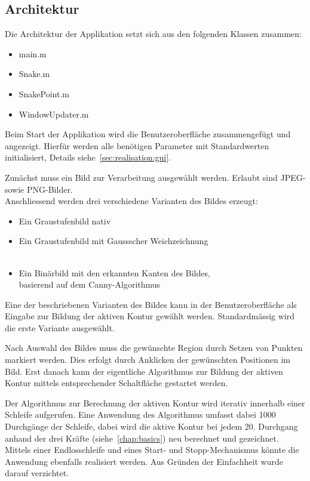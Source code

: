\subsection{Architektur}
\label{subsec:realization:arch}
Die Architektur der Applikation setzt sich aus den folgenden Klassen zusammen:

\begin{itemize}
    \item main.m
    \item Snake.m
    \item SnakePoint.m
    \item WindowUpdater.m
\end{itemize}

Beim Start der Applikation wird die Benutzeroberfläche zusammengefügt und angezeigt. Hierfür werden alle benötigen Parameter mit Standardwerten initialisiert, Details siehe~\ref{sec:realisation:gui}.

Zunächst muss ein Bild zur Verarbeitung ausgewählt werden. Erlaubt sind JPEG- sowie PNG-Bilder.\\
Anschliessend werden drei verschiedene Varianten des Bildes erzeugt:
\begin{itemize}
    \item Ein Graustufenbild nativ
    \item Ein Graustufenbild mit Gaussscher Weichzeichnung\\
        ~\cite[Details siehe Abschnitt 6.2.1.1, Seite 76]{hudritsch:script:cp}
    \item Ein Binärbild mit den erkannten Kanten des Bildes,\\
        basierend auf dem Canny-Algorithmus\\
        \cite[Details siehe Abschnitt 8.3.3, Seite 140]{hudritsch:script:cp}
\end{itemize}
Eine der beschriebenen Varianten des Bildes kann in der Benutzeroberfläche als Eingabe zur Bildung der aktiven Kontur gewählt werden. Standardmässig wird die erste Variante ausgewählt.

Nach Auswahl des Bildes muss die gewünschte Region durch Setzen von Punkten markiert werden. Dies erfolgt durch Anklicken der gewünschten Positionen im Bild. Erst danach kann der eigentliche Algorithmus zur Bildung der aktiven Kontur mittels entsprechender Schaltfläche gestartet werden.

Der Algorithmus zur Berechnung der aktiven Kontur wird iterativ innerhalb einer Schleife aufgerufen. Eine Anwendung des Algorithmus umfasst dabei 1000 Durchgänge der Schleife, dabei wird die aktive Kontur bei jedem 20. Durchgang anhand der drei Kräfte (siehe~\autoref{chap:basics}) neu berechnet und gezeichnet. Mittels einer Endlosschleife und eines Start- und Stopp-Mechanismus könnte die Anwendung ebenfalls realisiert werden. Aus Gründen der Einfachheit wurde darauf verzichtet.

